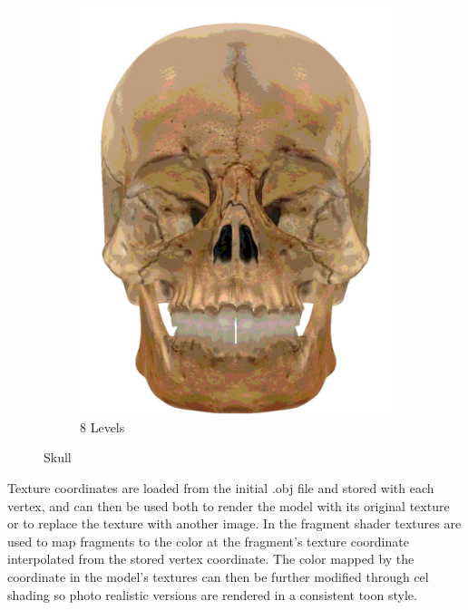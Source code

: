 \begin{figure}
\begin{subfigure}[b]{0.15\textwidth}
        \includegraphics[width=\textwidth]{img/textures/CelShadeTexture8Skull.png}
        \caption{8 Levels}
        \label{fig:CelShadeTexture8Skull}
    \end{subfigure}
\caption{Skull}
\end{figure} 

Texture coordinates are loaded from the initial .obj file and stored with each vertex, and can then be used both to render the model with its original texture or to replace the texture with another image. In the fragment shader textures are used to map fragments to the color at the fragment's texture coordinate interpolated from the stored vertex coordinate. The color mapped by the coordinate in the model's textures can then be further modified through cel shading so photo realistic versions are rendered in a consistent toon style.

